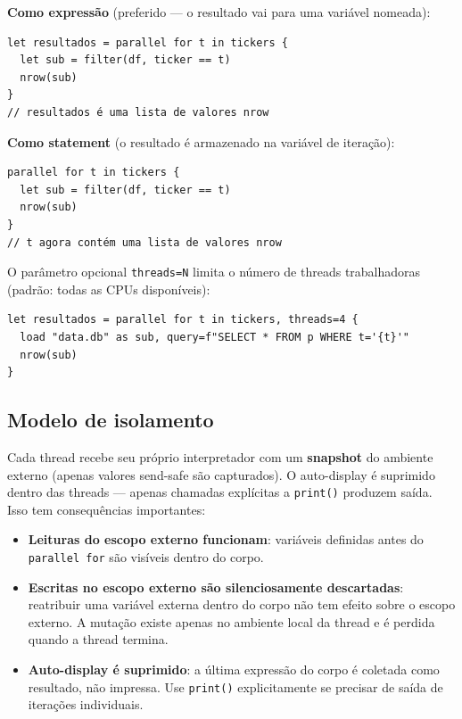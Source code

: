 \textbf{Como expressão} (preferido --- o resultado vai para uma variável
nomeada):

\begin{lstlisting}[caption={parallel for como expressão}]
let resultados = parallel for t in tickers {
  let sub = filter(df, ticker == t)
  nrow(sub)
}
// resultados é uma lista de valores nrow
\end{lstlisting}

\textbf{Como statement} (o resultado é armazenado na variável de
iteração):

\begin{lstlisting}[caption={parallel for como statement}]
parallel for t in tickers {
  let sub = filter(df, ticker == t)
  nrow(sub)
}
// t agora contém uma lista de valores nrow
\end{lstlisting}

O parâmetro opcional \texttt{threads=N} limita o número de threads
trabalhadoras (padrão: todas as CPUs disponíveis):

\begin{lstlisting}[caption={Limite de threads}]
let resultados = parallel for t in tickers, threads=4 {
  load "data.db" as sub, query=f"SELECT * FROM p WHERE t='{t}'"
  nrow(sub)
}
\end{lstlisting}

\subsection*{Modelo de isolamento}

Cada thread recebe seu próprio interpretador com um \textbf{snapshot} do
ambiente externo (apenas valores send-safe são capturados). O
auto-display é suprimido dentro das threads --- apenas chamadas
explícitas a \texttt{print()} produzem saída. Isso tem consequências
importantes:

\begin{itemize}
  \item \textbf{Leituras do escopo externo funcionam}: variáveis definidas
    antes do \texttt{parallel for} são visíveis dentro do corpo.
  \item \textbf{Escritas no escopo externo são silenciosamente descartadas}:
    reatribuir uma variável externa dentro do corpo não tem efeito sobre
    o escopo externo. A mutação existe apenas no ambiente local da thread
    e é perdida quando a thread termina.
  \item \textbf{Auto-display é suprimido}: a última expressão do corpo é
    coletada como resultado, não impressa. Use \texttt{print()}
    explicitamente se precisar de saída de iterações individuais.
\end{itemize}

